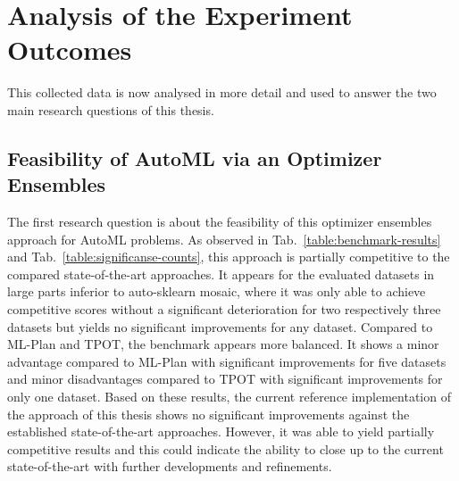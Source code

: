 \section{Analysis of the Experiment Outcomes}
\label{sec:evaluation:analysis}
This collected data is now analysed in more detail and used to answer the two main research questions of this thesis.

\subsection{Feasibility of AutoML via an Optimizer Ensembles}
\label{sec:evaluation:analysis:feasibility}
The first research question is about the feasibility of this optimizer ensembles approach for AutoML problems.\newline
As observed in Tab.~\ref{table:benchmark-results} and Tab.~\ref{table:significanse-counts}, this approach is partially competitive to the compared state-of-the-art approaches.
It appears for the evaluated datasets in large parts inferior to auto-sklearn mosaic, where it was only able to achieve competitive scores without a significant deterioration for two respectively three datasets but yields no significant improvements for any dataset.
Compared to ML-Plan and TPOT, the benchmark appears more balanced.
It shows a minor advantage compared to ML-Plan with significant improvements for five datasets and minor disadvantages compared to TPOT with significant improvements for only one dataset.\newline
Based on these results, the current reference implementation of the approach of this thesis shows no significant improvements against the established state-of-the-art approaches.
However, it was able to yield partially competitive results and this could indicate the ability to close up to the current state-of-the-art with further developments and refinements.

